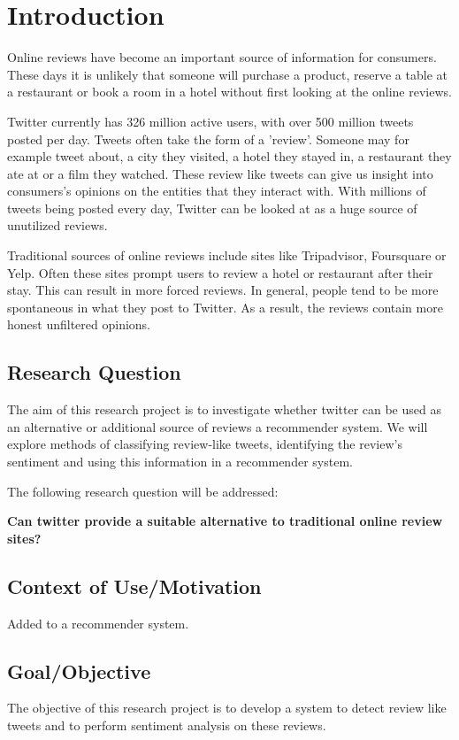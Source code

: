 \chapter{Introduction}
Online reviews have become an important source of information for consumers. These days it is unlikely that someone will purchase a product, reserve a table at a restaurant or book a room in a hotel without first looking at the online reviews.

Twitter currently has 326 million active users, with over 500 million tweets posted per day. Tweets often take the form of a 'review'. Someone may for example tweet about, a city they visited, a hotel they stayed in, a restaurant they ate at or a film they watched. These review like tweets can give us insight into consumers’s opinions on the entities that they interact with. With millions of tweets being posted every day, Twitter can be looked at as a huge source of unutilized reviews.

Traditional sources of online reviews include sites like Tripadvisor, Foursquare or Yelp. Often these sites prompt users to review a hotel or restaurant after their stay. This can result in more forced reviews. In general, people tend to be more spontaneous in what they post to Twitter. As a result, the reviews contain more honest unfiltered opinions. 

\section{Research Question}
The aim of this research project is to investigate whether twitter can be used as an alternative or additional source of reviews a recommender system. We will explore methods of classifying review-like tweets, identifying the review's sentiment and using this information in a recommender system.

The following research question will be addressed:

\textbf{Can twitter provide a suitable alternative to traditional online review sites?}\\

\section{Context of Use/Motivation}
Added to a recommender system.

\section{Goal/Objective}
The objective of this research project is to develop a system to detect review like tweets and to perform sentiment analysis on these reviews. 

